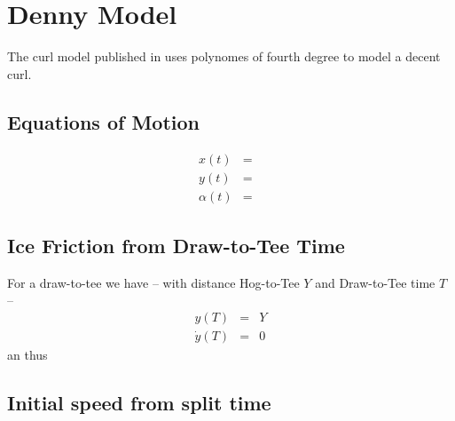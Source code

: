 \section{Denny Model}
The curl model published in \cite{denny:98} uses polynomes of fourth degree to
model a decent curl.

\subsection{Equations of Motion}
\begin{eqnarray}
x(t) &=&  \\
y(t) &=&  \\
\alpha(t) &=& 
\end{eqnarray}

\subsection{Ice Friction from Draw-to-Tee Time}
For a draw-to-tee we have -- with distance Hog-to-Tee $Y$ and Draw-to-Tee time 
$T$ --
\begin{eqnarray}
y(T) &=& Y \\
\dot y(T) &=& 0
\end{eqnarray}
an thus

\subsection{Initial speed from split time}
